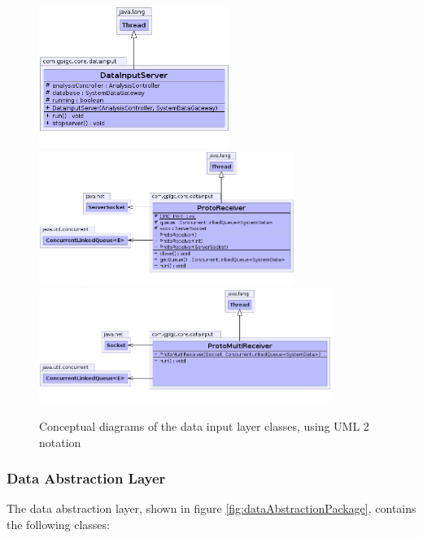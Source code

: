 \documentclass[10pt,a4paper]{article}
\begin{document}
\begin{figure}[ht!]
  \centering
  \includegraphics[width=6.2cm]{images/DataInputLayer/DataInputServer.png}
  \includegraphics[width=8.3cm]{images/DataInputLayer/ProtoReceiver.png}
  \includegraphics[width=9.5cm]{images/DataInputLayer/ProtoMultiReceiver.png}
  \caption{Conceptual diagrams of the data input layer classes, using 
UML 2 notation}
  \label{fig:dataInputLayer}
\end{figure}

\subsubsection{Data Abstraction Layer}

The data abstraction layer, shown in figure
\ref{fig:dataAbstractionPackage}, contains the following classes:
\end{document}
